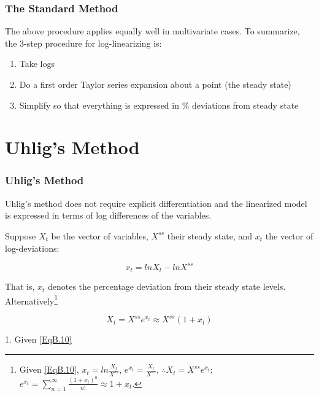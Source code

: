 \documentclass[10pt, handout]{beamer}
\begin{document}
\begin{frame}

\frametitle{The Standard Method} \vskip 0.1in

The above procedure applies equally well in multivariate cases. To summarize, the 3-step procedure for log-linearizing is:\vskip0.1in

\begin{enumerate}
\item Take logs
\item Do a first order Taylor series expansion about a point (the steady state)
\item Simplify so that everything is expressed in {$\%$} deviations from steady state
\end{enumerate}

\end{frame}


\section{Uhlig's Method}

\begin{frame}

\frametitle{Uhlig's Method} \vskip 0.1in

Uhlig's method does not require explicit differentiation and the
linearized model is expressed in terms of log differences of the
variables.\vskip 0.1in

\pause

Suppose $X_t$ be the vector of variables, $X^{ss}$ their steady
state, and $x_t$ the vector of log-deviations:

\begin{equation}\label{EqB.10}
x_t=ln{X_{t}}-ln{X^{ss}}
\end{equation}

That is, $x_t$ denotes the percentage deviation from their steady
state levels. Alternatively\footnote{Given \eqref{EqB.10},
$x_t=ln\frac{X_t}{X^{ss}}$, $e^{x_t}=\frac{X_t}{X^{ss}}$,
$\therefore X_t = X^{ss}e^{x_t}$; $
e^{x_t}=\sum_{n=1}^{\infty}\frac{(1+x_t)^n}{n!} \approx 1+x_t$.}

\begin{equation}\label{EqB.11}
X_t=X^{ss}e^{x_t}\approx X^{ss}(1+x_t)
\end{equation}

\vfill

{\footnotesize 1. Given \eqref{EqB.10} }


\end{frame}
\end{document}
